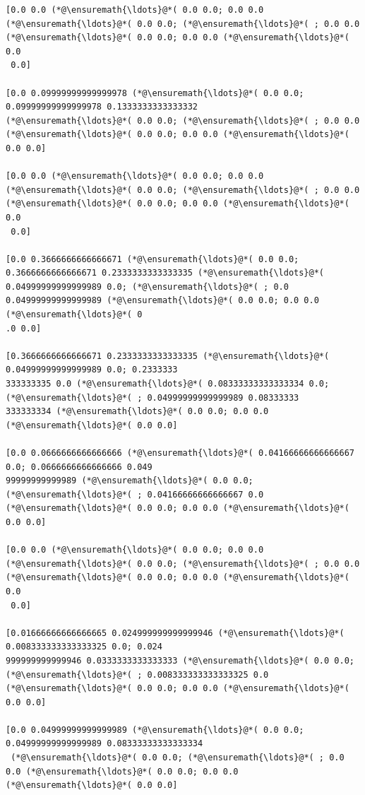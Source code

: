 \documentclass[12pt,a4paper]{article}
\begin{document}
\begin{lstlisting}
[0.0 0.0 (*@\ensuremath{\ldots}@*( 0.0 0.0; 0.0 0.0 (*@\ensuremath{\ldots}@*( 0.0 0.0; (*@\ensuremath{\ldots}@*( ; 0.0 0.0 (*@\ensuremath{\ldots}@*( 0.0 0.0; 0.0 0.0 (*@\ensuremath{\ldots}@*( 0.0
 0.0]

[0.0 0.09999999999999978 (*@\ensuremath{\ldots}@*( 0.0 0.0; 0.09999999999999978 0.1333333333333332 
(*@\ensuremath{\ldots}@*( 0.0 0.0; (*@\ensuremath{\ldots}@*( ; 0.0 0.0 (*@\ensuremath{\ldots}@*( 0.0 0.0; 0.0 0.0 (*@\ensuremath{\ldots}@*( 0.0 0.0]

[0.0 0.0 (*@\ensuremath{\ldots}@*( 0.0 0.0; 0.0 0.0 (*@\ensuremath{\ldots}@*( 0.0 0.0; (*@\ensuremath{\ldots}@*( ; 0.0 0.0 (*@\ensuremath{\ldots}@*( 0.0 0.0; 0.0 0.0 (*@\ensuremath{\ldots}@*( 0.0
 0.0]

[0.0 0.3666666666666671 (*@\ensuremath{\ldots}@*( 0.0 0.0; 0.3666666666666671 0.2333333333333335 (*@\ensuremath{\ldots}@*( 
0.04999999999999989 0.0; (*@\ensuremath{\ldots}@*( ; 0.0 0.04999999999999989 (*@\ensuremath{\ldots}@*( 0.0 0.0; 0.0 0.0 (*@\ensuremath{\ldots}@*( 0
.0 0.0]

[0.3666666666666671 0.2333333333333335 (*@\ensuremath{\ldots}@*( 0.04999999999999989 0.0; 0.2333333
333333335 0.0 (*@\ensuremath{\ldots}@*( 0.08333333333333334 0.0; (*@\ensuremath{\ldots}@*( ; 0.04999999999999989 0.08333333
333333334 (*@\ensuremath{\ldots}@*( 0.0 0.0; 0.0 0.0 (*@\ensuremath{\ldots}@*( 0.0 0.0]

[0.0 0.0666666666666666 (*@\ensuremath{\ldots}@*( 0.04166666666666667 0.0; 0.0666666666666666 0.049
99999999999989 (*@\ensuremath{\ldots}@*( 0.0 0.0; (*@\ensuremath{\ldots}@*( ; 0.04166666666666667 0.0 (*@\ensuremath{\ldots}@*( 0.0 0.0; 0.0 0.0 (*@\ensuremath{\ldots}@*( 
0.0 0.0]

[0.0 0.0 (*@\ensuremath{\ldots}@*( 0.0 0.0; 0.0 0.0 (*@\ensuremath{\ldots}@*( 0.0 0.0; (*@\ensuremath{\ldots}@*( ; 0.0 0.0 (*@\ensuremath{\ldots}@*( 0.0 0.0; 0.0 0.0 (*@\ensuremath{\ldots}@*( 0.0
 0.0]

[0.01666666666666665 0.024999999999999946 (*@\ensuremath{\ldots}@*( 0.008333333333333325 0.0; 0.024
999999999999946 0.0333333333333333 (*@\ensuremath{\ldots}@*( 0.0 0.0; (*@\ensuremath{\ldots}@*( ; 0.008333333333333325 0.0 
(*@\ensuremath{\ldots}@*( 0.0 0.0; 0.0 0.0 (*@\ensuremath{\ldots}@*( 0.0 0.0]

[0.0 0.04999999999999989 (*@\ensuremath{\ldots}@*( 0.0 0.0; 0.04999999999999989 0.08333333333333334
 (*@\ensuremath{\ldots}@*( 0.0 0.0; (*@\ensuremath{\ldots}@*( ; 0.0 0.0 (*@\ensuremath{\ldots}@*( 0.0 0.0; 0.0 0.0 (*@\ensuremath{\ldots}@*( 0.0 0.0]


\end{lstlisting}
\end{document}

